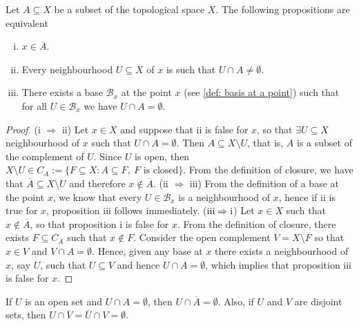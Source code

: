 \begin{proposition}\label{prop: closure equivalent prop}
Let \(A \subseteq X\) be a subset of the topological space \(X\). The
following propositions are equivalent
\begin{enumerate}[(i)]
  \item \(x \in \overline A\).
  \item Every neighbourhood \(U \subseteq X\) of \(x\) is such that \(U
    \cap A \neq \emptyset\).
  \item There exists a base \(\mathcal B_x\) at the point \(x\) (see
    \cref{def: basis at a point}) such that for all \(U \in \mathcal B_x\) we
    have \(U \cap A = \emptyset\).
\end{enumerate}
\end{proposition}

\begin{proof}
(i \(\Rightarrow\) ii) Let \(x \in X\) and suppose that ii is false for \(x\),
so that \(\exists U \subseteq X\) neighbourhood of \(x\) such that \(U \cap A
= \emptyset\). Then \(A \subseteq X \setminus U\), that is, \(A\) is a subset
of the complement of \(U\). Since \(U\) is open, then \(X \setminus U \in C_A
:= \{F \subseteq X : A \subseteq F,\ F \text{ is closed}\}\). From the
definition of closure, we have that \(\overline A \subseteq X \setminus U\)
and therefore \(x \not\in \overline A\). (ii \(\Rightarrow\) iii) From the
definition of a base at the point \(x\), we know that every \(U \in \mathcal
B_x\) is a neighbourhood of \(x\), hence if ii is true for \(x\), proposition
iii follows immediately. (\(\text{iii} \Rightarrow \text i\)) Let \(x \in X\)
such that \(x \not\in \overline A\), so that proposition i is false for \(x\).
From the definition of closure, there exists \(F \subseteq C_A\) such that \(x
\not\in F\). Consider the open complement \(V = X \setminus F\) so that \(x
\in V\) and \(V \cap A = \emptyset\). Hence, given any base at \(x\) there
exists a neighbourhood of \(x\), say \(U\), such that \(U \subseteq V\) and
hence \(U \cap A = \emptyset\), which implies that proposition iii is false
for \(x\).
\end{proof}

\begin{corollary}\label{cor: disjoint closure persistence}
If \(U\) is an open set and \(U \cap A = \emptyset\), then \(U \cap \overline
A = \emptyset\). Also, if \(U\) and \(V\) are disjoint sets, then \(U \cap
\overline V = \overline U \cap V = \emptyset\).
\end{corollary}

